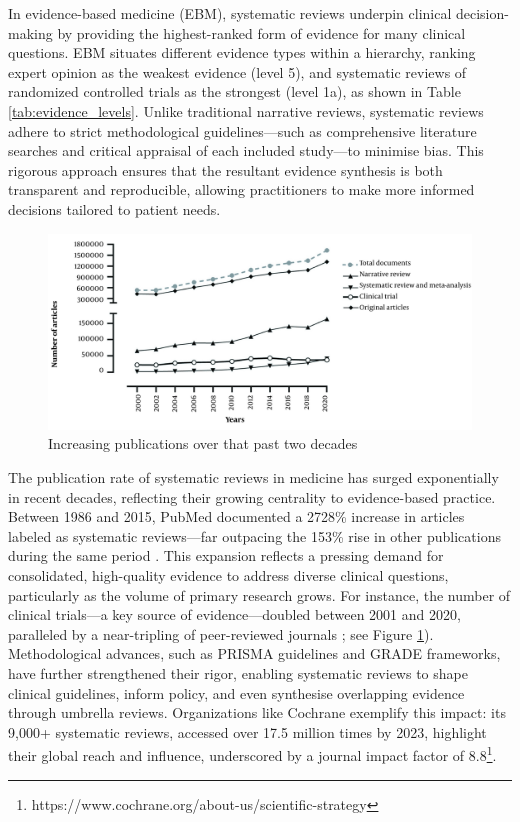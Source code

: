 \documentclass[10pt, english]{article}
\begin{document}
In evidence-based medicine (EBM), systematic reviews underpin clinical decision-making by providing the highest-ranked form of evidence for many clinical questions. EBM situates different evidence types within a hierarchy, ranking expert opinion as the weakest evidence (level 5), and systematic reviews of randomized controlled trials as the strongest (level 1a), as shown in Table \ref{tab:evidence_levels}. Unlike traditional narrative reviews, systematic reviews adhere to strict methodological guidelines—such as comprehensive literature searches and critical appraisal of each included study—to minimise bias. This rigorous approach ensures that the resultant evidence synthesis is both transparent and reproducible, allowing practitioners to make more informed decisions tailored to patient needs.



\begin{figure}
    \centering
    \includegraphics[width=1\linewidth]{images/increase_in_publications.jpg}
    \caption{Increasing publications over that past two decades \cite{ghasemi_scientific_2022}}
    \label{fig:increasing_publications_over_time}
\end{figure}

The publication rate of systematic reviews in medicine has surged exponentially in recent decades, reflecting their growing centrality to evidence-based practice. Between 1986 and 2015, PubMed documented a 2728\% increase in articles labeled as systematic reviews—far outpacing the 153\% rise in other publications during the same period  \cite{ioannidis_mass_2016}. This expansion reflects a pressing demand for consolidated, high-quality evidence to address diverse clinical questions, particularly as the volume of primary research grows. For instance, the number of clinical trials—a key source of evidence—doubled between 2001 and 2020, paralleled by a near-tripling of peer-reviewed journals \cite{ghasemi_scientific_2022}; see Figure \ref{fig:increasing_publications_over_time}). Methodological advances, such as PRISMA guidelines and GRADE frameworks, have further strengthened their rigor, enabling systematic reviews to shape clinical guidelines, inform policy, and even synthesise overlapping evidence through umbrella reviews. Organizations like Cochrane exemplify this impact: its 9,000+ systematic reviews, accessed over 17.5 million times by 2023, highlight their global reach and influence, underscored by a journal impact factor of 8.8\footnote{https://www.cochrane.org/about-us/scientific-strategy}.
\end{document}
